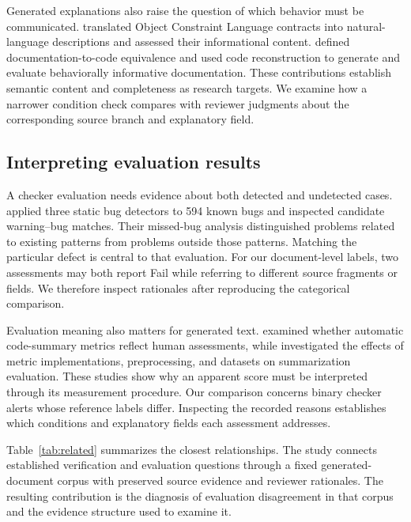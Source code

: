 \documentclass[a4paper,fleqn]{cas-dc}
\begin{document}
Generated explanations also raise the question of which behavior must be communicated. \citet{Yang2026OCL2NL} translated Object Constraint Language contracts into natural-language descriptions and assessed their informational content. \citet{Eghbali2026} defined documentation-to-code equivalence and used code reconstruction to generate and evaluate behaviorally informative documentation. These contributions establish semantic content and completeness as research targets. We examine how a narrower condition check compares with reviewer judgments about the corresponding source branch and explanatory field.

\subsection{Interpreting evaluation results}
A checker evaluation needs evidence about both detected and undetected cases. \citet{HabibPradel2018} applied three static bug detectors to 594 known bugs and inspected candidate warning--bug matches. Their missed-bug analysis distinguished problems related to existing patterns from problems outside those patterns. Matching the particular defect is central to that evaluation. For our document-level labels, two assessments may both report Fail while referring to different source fragments or fields. We therefore inspect rationales after reproducing the categorical comparison.

Evaluation meaning also matters for generated text. \citet{Roy2021} examined whether automatic code-summary metrics reflect human assessments, while \citet{Shi2022} investigated the effects of metric implementations, preprocessing, and datasets on summarization evaluation. These studies show why an apparent score must be interpreted through its measurement procedure. Our comparison concerns binary checker alerts whose reference labels differ. Inspecting the recorded reasons establishes which conditions and explanatory fields each assessment addresses.

Table~\ref{tab:related} summarizes the closest relationships. The study connects established verification and evaluation questions through a fixed generated-document corpus with preserved source evidence and reviewer rationales. The resulting contribution is the diagnosis of evaluation disagreement in that corpus and the evidence structure used to examine it.
\end{document}
